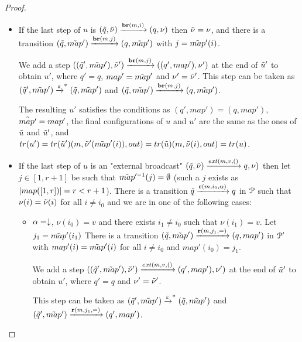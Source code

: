 \begin{proof}
	\begin{itemize}
		\item 
		If the last step of $u$ is $(\Tilde{q}, \Tilde{\nu}) \xrightarrow{\textbf{br}(m, i)} (q, \nu)$ then $\Tilde{\nu} = \nu$, and there is a transition $(\Tilde{q}, \Tilde{map}') \xrightarrow{\textbf{br}(m, j)} (q, \Tilde{map}')$ with $j=\Tilde{map}'(i)$.
		
		We add a step $((\Tilde{q}', \Tilde{map}'), \Tilde{\nu}') \xrightarrow{\textbf{br}(m, j)} ((q', map'), \nu')$ at the end of $\Tilde{u}'$ to obtain $u'$, where $q' = q$, $map' = \Tilde{map}'$ and $\nu' = \Tilde{\nu}'$. 
		This step can be taken as $(\Tilde{q}', \Tilde{map}') \xrightarrow{\varepsilon}^* (\Tilde{q}, \Tilde{map}')$ and $(\Tilde{q}, \Tilde{map}') \xrightarrow{\textbf{br}(m, j)} (q, \Tilde{map}')$.   
		
		The resulting $u'$ satisfies the conditions as $(q', map') = (q, map')$, $\Tilde{map'} = map'$, the final configurations of $u$ and $u'$ are the same as the ones of $\Tilde{u}$ and $\Tilde{u}'$, and $\trace{u'} = \trace{\Tilde{u}'} (m,\Tilde{\nu}'(\Tilde{map}'(i)),out) = \trace{\Tilde{u}} (m,\Tilde{\nu}(i),out) = \trace{u}$.
		
		\item 
		If the last step of $u$ is an "external broadcast" $(\Tilde{q}, \Tilde{\nu}) \extbr{m, v} (q, \nu)$ then let $j\in [1,r+1]$ be such that $\Tilde{map}'^{-1}(j) = \emptyset$ (such a $j$ exists as $|map([1,r])| = r < r+1$). There is a transition $\Tilde{q} \xrightarrow{\textbf{r}(m, i_0, \alpha)} q$ in $\mathcal{P}$ such that $\nu(i)=\Tilde{\nu}(i)$ for all $i\neq i_0$ and we are in one of the following cases:
		
		\begin{itemize}
			\item $\alpha=\downarrow$, $\nu(i_0) = v$ and there exists $i_1 \neq i_0$ such that $\nu(i_1) = v$. Let $j_1=\Tilde{map}'(i_1)$
			There is a transition $(\Tilde{q}, \Tilde{map}') \xrightarrow{\textbf{r}(m, j_1, {=})} (q, map')$ in $\mathcal{P}'$ with $map'(i) = \Tilde{map}'(i)$ for all $i\neq i_0$ and $map'(i_0) = j_1$.
			
			We add a step $((\Tilde{q}', \Tilde{map}'), \Tilde{\nu}') \extbr{m, v} ((q', map'), \nu')$ at the end of $\Tilde{u}'$ to obtain $u'$, where $q' = q$ and $\nu' = \Tilde{\nu}'$.
			
			This step can be taken as $(\Tilde{q}', \Tilde{map}') \xrightarrow{\varepsilon}^* (\Tilde{q}, \Tilde{map}')$ and $(\Tilde{q}', \Tilde{map}') \xrightarrow{\textbf{r}(m, j_1, {=})} (q', map')$. 
			

\end{itemize}
\end{itemize}
\end{proof}

